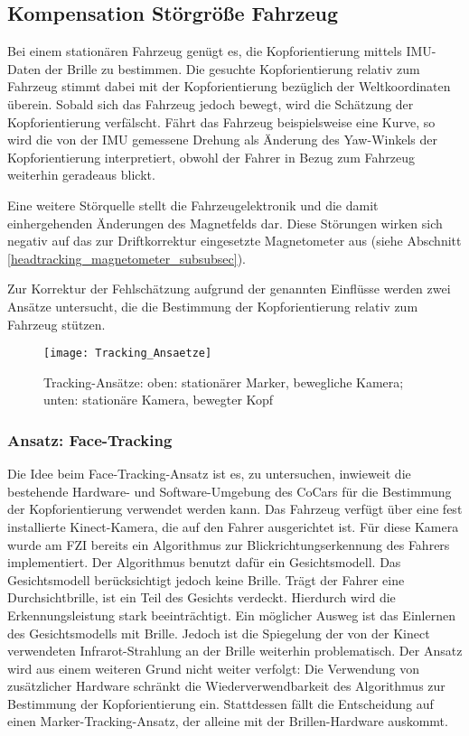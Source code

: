 
\subsection{Kompensation Störgröße Fahrzeug}
\label{headtracking_marker_subsec}

Bei einem stationären Fahrzeug genügt es, die Kopforientierung mittels \acs{IMU}-Daten der Brille zu bestimmen.
Die gesuchte Kopforientierung relativ zum Fahrzeug stimmt dabei mit der Kopforientierung bezüglich der Weltkoordinaten überein.
Sobald sich das Fahrzeug jedoch bewegt, wird die Schätzung der Kopforientierung verfälscht.
Fährt das Fahrzeug beispielsweise eine Kurve, so wird die von der IMU gemessene Drehung als Änderung des Yaw-Winkels der Kopforientierung interpretiert, obwohl der Fahrer in Bezug zum Fahrzeug weiterhin geradeaus blickt.

Eine weitere Störquelle stellt die Fahrzeugelektronik und die damit einhergehenden Änderungen des Magnetfelds dar.
Diese Störungen wirken sich negativ auf das zur Driftkorrektur eingesetzte Magnetometer aus (siehe Abschnitt \ref{headtracking_magnetometer_subsubsec}).

Zur Korrektur der Fehlschätzung aufgrund der genannten Einflüsse werden zwei Ansätze untersucht, die die Bestimmung der Kopforientierung relativ zum Fahrzeug stützen.

\begin{figure}[h]
  \centering
  \texttt{[image: Tracking\_Ansaetze]}
  \caption{Tracking-Ansätze: oben: stationärer Marker, bewegliche Kamera; unten: stationäre Kamera, bewegter Kopf}
  \label{fig:tracking_ansaetze}
\end{figure}


\subsubsection{Ansatz: Face-Tracking}

Die Idee beim Face-Tracking-Ansatz ist es, zu untersuchen, inwieweit die bestehende Hardware- und Software-Umgebung des CoCars für die Bestimmung der Kopforientierung verwendet werden kann.
Das Fahrzeug verfügt über eine fest installierte Kinect-Kamera, die auf den Fahrer ausgerichtet ist.
Für diese Kamera wurde am \ac{FZI} bereits ein Algorithmus zur Blickrichtungserkennung des Fahrers implementiert.
Der Algorithmus benutzt dafür ein Gesichtsmodell.
Das Gesichtsmodell berücksichtigt jedoch keine Brille.
Trägt der Fahrer eine Durchsichtbrille, ist ein Teil des Gesichts verdeckt.
Hierdurch wird die Erkennungsleistung stark beeinträchtigt.
Ein möglicher Ausweg ist das Einlernen des Gesichtsmodells mit Brille.
Jedoch ist die Spiegelung der von der Kinect verwendeten Infrarot-Strahlung an der Brille weiterhin problematisch.
Der Ansatz wird aus einem weiteren Grund nicht weiter verfolgt:
Die Verwendung von zusätzlicher Hardware schränkt die Wiederverwendbarkeit des Algorithmus zur Bestimmung der Kopforientierung ein.
Stattdessen fällt die Entscheidung auf einen Marker-Tracking-Ansatz, der alleine mit der Brillen-Hardware auskommt.


